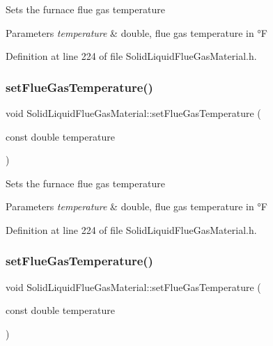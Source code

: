 Sets the furnace flue gas temperature 
\begin{DoxyParams}{Parameters}
{\em temperature} & double, flue gas temperature in °F \\
\hline
\end{DoxyParams}


Definition at line 224 of file Solid\+Liquid\+Flue\+Gas\+Material.\+h.

\mbox{\label{class_solid_liquid_flue_gas_material_ae647700dbff5ccea7938b2117f2c3156}} 
\subsubsection{\texorpdfstring{set\+Flue\+Gas\+Temperature()}{setFlueGasTemperature()}\hspace{0.1cm}{\footnotesize\ttfamily [2/3]}}
{\footnotesize\ttfamily void Solid\+Liquid\+Flue\+Gas\+Material\+::set\+Flue\+Gas\+Temperature (\begin{DoxyParamCaption}\item[{const double}]{temperature }\end{DoxyParamCaption})\hspace{0.3cm}{\ttfamily [inline]}}

Sets the furnace flue gas temperature 
\begin{DoxyParams}{Parameters}
{\em temperature} & double, flue gas temperature in °F \\
\hline
\end{DoxyParams}


Definition at line 224 of file Solid\+Liquid\+Flue\+Gas\+Material.\+h.

\mbox{\label{class_solid_liquid_flue_gas_material_ae647700dbff5ccea7938b2117f2c3156}} 
\subsubsection{\texorpdfstring{set\+Flue\+Gas\+Temperature()}{setFlueGasTemperature()}\hspace{0.1cm}{\footnotesize\ttfamily [3/3]}}
{\footnotesize\ttfamily void Solid\+Liquid\+Flue\+Gas\+Material\+::set\+Flue\+Gas\+Temperature (\begin{DoxyParamCaption}\item[{const double}]{temperature }\end{DoxyParamCaption})\hspace{0.3cm}{\ttfamily [inline]}}

